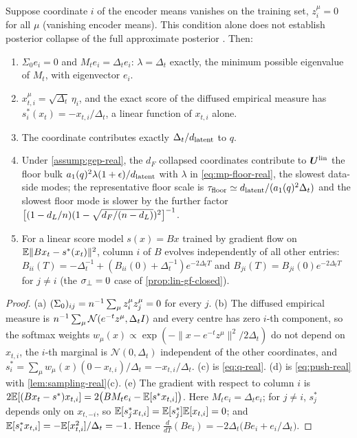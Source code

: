 \begin{lemma}\label{lem:dead-real}
Suppose coordinate $i$ of the encoder means vanishes on the training set, $z^\mu_i=0$ for all $\mu$ (vanishing encoder means). This condition alone does not establish posterior collapse of the full approximate posterior \citep{lucas2019dontblame}. Then:
\begin{enumerate}
\item[(a)] $\Sigma_0e_i=0$ and $M_te_i=\Delta_te_i$: $\lambda=\Delta_t$ exactly, the minimum possible eigenvalue of $M_t$, with eigenvector $e_i$.
\item[(b)] $x^\mu_{t,i}=\sqrt{\Delta_t}\,\eta_i$, and the exact score of the diffused empirical measure \citep{scarvelis2023closedform,gu2023memorization,biroli2024dynamical} has $s^\ast_i(x_t)=-x_{t,i}/\Delta_t$, a linear function of $x_{t,i}$ alone.
\item[(c)] The coordinate contributes exactly $\Delta_t/d_{\mathrm{latent}}$ to $q$.
\item[(d)] Under \cref{assump:gep-real}, the $d_F$ collapsed coordinates contribute to $\bm{U}^{\mathrm{lin}}$ the floor bulk $a_1(q)^2\lambda(1+\epsilon)/d_{\mathrm{latent}}$ with $\lambda$ in \eqref{eq:mp-floor-real}, the slowest data-side modes; the representative floor scale is $\tau_{\mathrm{floor}}\simeq d_{\mathrm{latent}}/(a_1(q)^2\Delta_t)$ and the slowest floor mode is slower by the further factor $\big[(1-d_L/n)(1-\sqrt{d_F/(n-d_L)})^2\big]^{-1}$.
\item[(e)] For a linear score model $s(x)=Bx$ trained by gradient flow on $\mathbb{E}\|Bx_t-s^\ast(x_t)\|^2$, column $i$ of $B$ evolves independently of all other entries: $B_{ii}(T)=-\Delta_t^{-1}+(B_{ii}(0)+\Delta_t^{-1})e^{-2\Delta_tT}$ and $B_{ji}(T)=B_{ji}(0)e^{-2\Delta_tT}$ for $j\ne i$ (the $\sigma_{\perp}=0$ case of \cref{prop:lin-gf-closed}).
\end{enumerate}
\end{lemma}
\begin{proof}
(a) $(\Sigma_0)_{ij}=n^{-1}\sum_\mu z^\mu_iz^\mu_j=0$ for every $j$. (b) The diffused empirical measure is $n^{-1}\sum_\mu\mathcal N(e^{-t}z^\mu,\Delta_tI)$ and every centre has zero $i$-th component, so the softmax weights $w_\mu(x)\propto\exp(-\|x-e^{-t}z^\mu\|^2/2\Delta_t)$ do not depend on $x_{t,i}$, the $i$-th marginal is $\mathcal N(0,\Delta_t)$ independent of the other coordinates, and $s^\ast_i=\sum_\mu w_\mu(x)(0-x_{t,i})/\Delta_t=-x_{t,i}/\Delta_t$. (c) is \eqref{eq:q-real}. (d) is \eqref{eq:push-real} with \cref{lem:sampling-real}(c). (e) The gradient with respect to column $i$ is $2\mathbb{E}[(Bx_t-s^\ast)x_{t,i}]=2\big(BM_te_i-\mathbb{E}[s^\ast x_{t,i}]\big)$. Here $M_te_i=\Delta_te_i$; for $j\ne i$, $s^\ast_j$ depends only on $x_{t,-i}$, so $\mathbb{E}[s^\ast_jx_{t,i}]=\mathbb{E}[s^\ast_j]\mathbb{E}[x_{t,i}]=0$; and $\mathbb{E}[s^\ast_ix_{t,i}]=-\mathbb{E}[x_{t,i}^2]/\Delta_t=-1$. Hence $\frac{d}{dT}(Be_i)=-2\Delta_t\big(Be_i+e_i/\Delta_t\big)$.
\end{proof}
